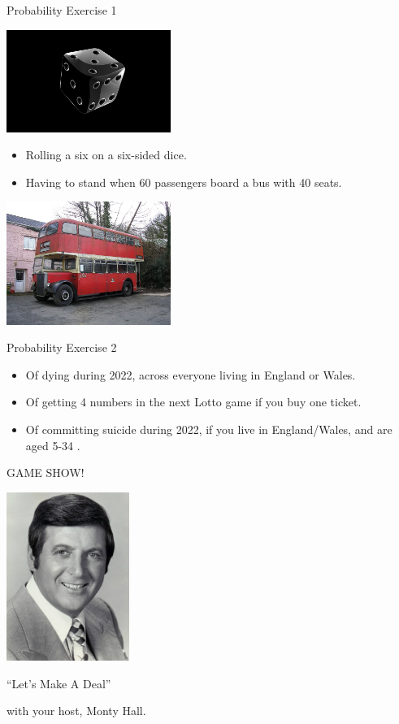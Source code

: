 \documentclass{beamer}
\begin{document}
\begin{frame}{Probability Exercise 1}
\centerline{\includegraphics[width=0.4\textwidth]{pics/dice.jpg}}
\begin{itemize}
\item Rolling a six on a six-sided dice.
\item Having to stand when 60 passengers board a bus with 40 seats.
\end{itemize}
\centerline{\includegraphics[width=0.4\textwidth]{pics/plymouthbus.jpg}}
\end{frame}


\begin{frame}{Probability Exercise 2}
\begin{itemize}
\item Of dying during 2022, across everyone living in England or Wales.
\item Of getting 4 numbers in the next Lotto game if you buy one ticket.
\item Of committing suicide during 2022, if you live in England/Wales, and are aged 5-34 .
\end{itemize}
\end{frame}

\begin{frame}{GAME SHOW!}
\centerline{\includegraphics[width=0.3\textwidth]{pics/montyphoto.jpg}}
\centerline{``Let's Make A Deal''}
\centerline{with your host, Monty Hall.}
\end{frame}
\end{document}
